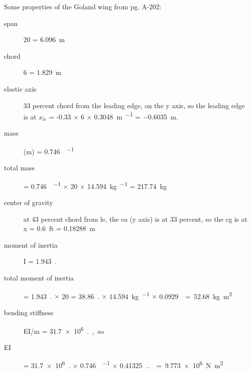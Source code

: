 \documentclass[10pt,openany,twoside]{book}
\numberwithin{equation}{section}   %
\let\US\SI
\begin{document}
Some properties of the Goland wing from \cite{goland1945flutter} pg. A-202:
\begin{description}
\item[span] \US{20}{\ft} = \SI{6.096}{m}
\item[chord] \US{6}{\ft} = \SI{1.829}{m}
\item[elastic axis] 33 percent chord from the leading edge, on the y axis, so
	the leading edge is at
	\newline
	$x_{le}$ = -0.33 $\times$ \qty{6}{\ft} $\times$ \qty[per-mode=symbol]{0.3048}{\m\per\ft}
	= \qty{-0.6035}{\m}.
\item[mass] (m) = \qty[per-mode = symbol]{0.746}{\slug\per\ft}
\item[total mass] = \qty[per-mode = symbol]{0.746}{\slug\per\ft}
		$\times$ \qty{20}{\ft}
		$\times$ \qty[per-mode = symbol]{14.594}{\kg\per\slug} = \qty{217.74}{\kg}

\item[center of gravity] at 43 percent chord from le, the ea (y axis) is at
	33 percent, so the cg is at x = \US{0.6}{ft} = \SI{0.18288}{m}

\item[moment of inertia] I = \qty[per-mode = symbol]{1.943}{\slug.\square\ft\per\ft}
\item[total moment of inertia] = \qty[per-mode = symbol]{1.943}{\slug.\square\ft\per\ft}
	$\times$ \qty{20}{\ft} = \qty[per-mode = symbol]{38.86}{\slug.\square\ft}
	$\times$ \qty[per-mode = symbol]{14.594}{\kg\per\slug}
	$\times$ \qty[per-mode = symbol]{0.0929}{\square\metre\per\square\ft}
	= \qty{52.68}{\kg\square\meter}

\item[bending stiffness] EI/m = \US{31.7e+6}{\lb.\cubic\ft\per\slug}, so
\item[EI] = \US{31.7e+6}{\lb.\cubic\ft\per\slug}
		$\times$ \qty[per-mode = symbol]{0.746}{\slug\per\ft}
		$\times$ \qty[per-mode = symbol]{0.41325}{\N.\square\m\per\lb.\square\ft}
		\newline = \qty{9.773e+6}{\N.\square\m}


\end{description}
\end{document}
